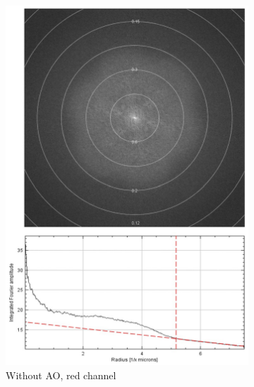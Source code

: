 \begin{figure}
	
	\begin{subfigure}[t]{0.45\textwidth}
		\centering
		\includegraphics[width=\linewidth]{images/DeepSIM_NMJ_woAO_Alexa568_ft_and_plot.jpg}
		\caption{Without AO, red channel}
		\label{fig:DeepSIM_NMJ_woAO_Alexa568_ft_and_plot}
	\end{subfigure}
	\begin{subfigure}[t]{0.45\textwidth}
		\centering

\end{subfigure}
\end{figure}
